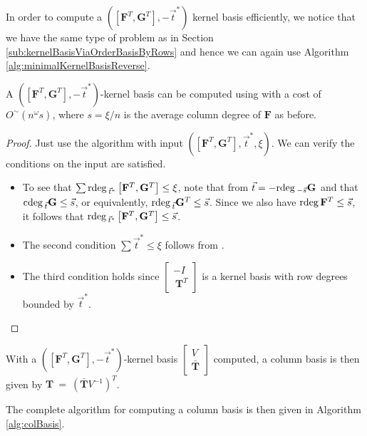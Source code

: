 In order to compute a $\left(\left[\mathbf{F}^{T},\mathbf{G}^{T}\right],-\vec{t}^{*}\right)$
kernel basis efficiently, we notice that we have the same type of
problem as in Section \ref{sub:kernelBasisViaOrderBasisByRows} and
hence we can again use Algorithm \ref{alg:minimalKernelBasisReverse}. 
\begin{lem}
\label{lem:costOfKernelBasisReversedForLeftFactor}A $\left(\left[\mathbf{F}^{T},\mathbf{G}^{T}\right],-\vec{t}^{*}\right)$-kernel
basis can be computed using 
with a cost of $O^{\sim}\left(n^{\omega}s\right)$, where $s=\xi/n$
is the average column degree of $\mathbf{F}$ as before. \end{lem}
\begin{proof}
Just use the algorithm with input $\left(\left[\mathbf{F}^{T},\mathbf{G}^{T}\right],\vec{t}^{*},\xi\right)$.
We can verify the conditions on the input are satisfied.
\begin{itemize}
\item To see that $\sum{\rm rdeg}\,_{\vec{t}^{*}}\left[\mathbf{F}^{T},\mathbf{G}^{T}\right]\le\xi$,
note that from $\vec{t}=-{\rm rdeg}\,_{-\vec{s}}\mathbf{G}$ and  that 
${\rm cdeg}\,_{\vec{t}}\mathbf{G}\le\vec{s}$, or equivalently, ${\rm rdeg}\,_{\vec{t}}\mathbf{G}^{T}\le\vec{s}$.
Since we also have ${\rm rdeg}\,\mathbf{F}^{T}\le\vec{s}$, it follows that
${\rm rdeg}\,_{\vec{t}^{*}}\left[\mathbf{F}^{T},\mathbf{G}^{T}\right]\le\vec{s}$. 
\item The second condition $\sum\vec{t}^{*}\le\xi$ follows from .
\item The third condition holds since $\begin{bmatrix}-I~\\
~\mathbf{T}^{T}
\end{bmatrix}$ is a kernel basis with row degrees bounded by $\vec{t}^{*}$.
\end{itemize}
\end{proof}
With a $\left(\left[\mathbf{F}^{T},\mathbf{G}^{T}\right],-\vec{t}^{*}\right)$-kernel
basis $\begin{bmatrix}V\\
\bar{\mathbf{T}}
\end{bmatrix}$ computed, a column basis is then given by $\mathbf{T}~=~\left(\bar{\mathbf{T}}V^{-1}\right)^{T}$.

The complete algorithm for computing a column basis is then given
in Algorithm \ref{alg:colBasis}.


